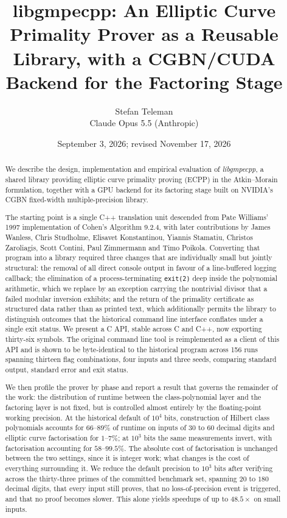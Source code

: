 \documentclass[11pt,a4paper]{article}
\title{\textbf{libgmpecpp}: An Elliptic Curve Primality Prover as a
  Reusable Library, with a CGBN/CUDA Backend for the Factoring Stage}
\author{Stefan Teleman \code{<stefan.teleman@gmail.com>}\\[4pt]Claude Opus 5.5 (Anthropic)}
\date{September 3, 2026; revised November 17, 2026}
\newcommand{\code}[1]{\texttt{#1}}
\begin{document}
\maketitle

\begin{abstract}
We describe the design, implementation and empirical evaluation of
\emph{libgmpecpp}, a shared library providing elliptic curve primality
proving (ECPP) in the Atkin--Morain formulation, together with a GPU
backend for its factoring stage built on NVIDIA's CGBN fixed-width
multiple-precision library.

The starting point is a single C++ translation unit descended from
Pate Williams' 1997 implementation of Cohen's Algorithm 9.2.4, with
later contributions by James Wanless, Chris Studholme, Elisavet
Konstantinou, Yiannis Stamatiu, Christos Zaroliagis, Scott Contini, Paul
Zimmermann and Timo Poikola. Converting that program into a library
required three changes that are individually small but jointly
structural: the removal of all direct console output in favour of a
line-buffered logging callback; the elimination of a process-terminating
\code{exit(2)} deep inside the polynomial arithmetic, which we replace by
an exception carrying the nontrivial divisor that a failed modular
inversion exhibits; and the return of the primality certificate as
structured data rather than as printed text, which additionally permits
the library to distinguish outcomes that the historical command line
interface conflates under a single exit status. We present a C API,
stable across C and C++, now exporting thirty-six symbols. The original
command line tool is reimplemented as a client of this API and is shown
to be byte-identical to the historical program across 156 runs spanning
thirteen flag combinations, four inputs and three seeds, comparing
standard output, standard error and exit status.

We then profile the prover by phase and report a result that governs the
remainder of the work: the distribution of runtime between the
class-polynomial layer and the factoring layer is not fixed, but is
controlled almost entirely by the floating-point working precision. At
the historical default of $10^4$ bits, construction of Hilbert class
polynomials accounts for $66$--$89\%$ of runtime on inputs of $30$ to
$60$ decimal digits and elliptic curve factorisation for $1$--$7\%$; at
$10^3$ bits the same measurements invert, with factorisation accounting
for $58$--$99.5\%$. The absolute cost of factorisation is unchanged
between the two settings, since it is integer work; what changes is the
cost of everything surrounding it. We reduce the default precision to
$10^3$ bits after verifying across the thirty-three primes of the committed
benchmark set, spanning $20$ to $180$ decimal digits, that every input still proves, that no
loss-of-precision event is triggered, and that no proof becomes slower.
This alone yields speedups of up to $48.5\times$ on small inputs.


\end{abstract}
\end{document}
